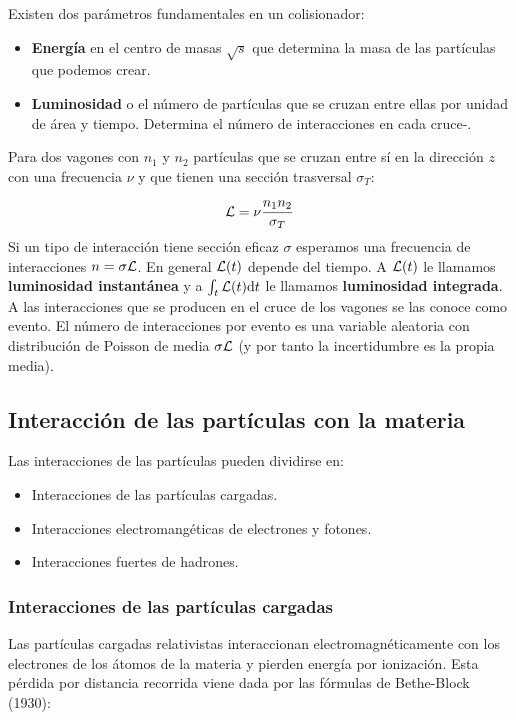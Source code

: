 Existen dos parámetros fundamentales en un colisionador:

\begin{itemize}
	\item \textbf{Energía} en el centro de masas $\sqrt{s}$ que determina la masa de las partículas que podemos crear.
	\item \textbf{Luminosidad} o el número de partículas que se cruzan entre ellas por unidad de área y tiempo. Determina el número de interacciones en cada cruce-.
\end{itemize}

Para dos vagones con $n_1$ y $n_2$ partículas que se cruzan entre sí en la dirección $z$ con una frecuencia $\nu$ y que tienen una sección trasversal $\sigma_T$:

\begin{equation}
	\mathcal{L} = \nu \frac{n_1n_2}{\sigma_T}
\end{equation}
Si un tipo de interacción tiene sección eficaz $\sigma$ esperamos una frecuencia de interacciones $n=\sigma \mathcal{L}$. En general $\mathcal{L}(t)$ depende del tiempo. A $\mathcal{L}(t)$ le llamamos \textbf{luminosidad instantánea} y a $\int_t \mathcal{L} (t)\mathrm{d} t$ le llamamos \textbf{luminosidad integrada}. A las interacciones que se producen en el cruce de los vagones se las conoce como evento. El número de interacciones por evento es una variable aleatoria con distribución de Poisson de media $\sigma \mathcal{L}$ (y por tanto la incertidumbre es la propia media).

\subsection{Interacción de las partículas con la materia}

Las interacciones de las partículas pueden dividirse en:

\begin{itemize}
	\item Interacciones de las partículas cargadas.
	\item Interacciones electromangéticas de electrones y fotones.
	\item Interacciones fuertes de hadrones.
\end{itemize}

\subsubsection{Interacciones de las partículas cargadas}

Las partículas cargadas relativistas interaccionan electromagnéticamente con los electrones de los átomos de la materia y pierden energía por ionización. Esta pérdida por distancia recorrida viene dada por las fórmulas de Bethe-Block (1930):

